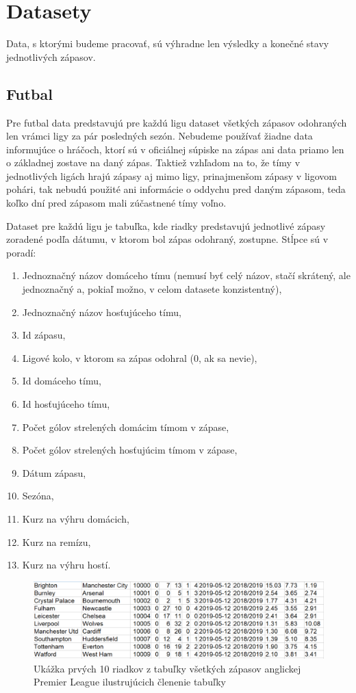 \chapter{Datasety}

Data, s ktorými budeme pracovať, sú výhradne len výsledky a konečné stavy jednotlivých zápasov. 

\section{Futbal} \label{foot}
Pre futbal data predstavujú pre každú ligu dataset všetkých zápasov odohraných len vrámci ligy za pár posledných sezón. 
Nebudeme používať žiadne data informujúce o hráčoch, ktorí sú v oficiálnej súpiske na zápas ani data priamo len o základnej zostave na daný zápas. 
Taktiež vzhľadom na to, že tímy v jednotlivých ligách hrajú zápasy aj mimo ligy, prinajmenšom zápasy v ligovom pohári, tak nebudú použité ani informácie o oddychu pred daným zápasom, teda koľko dní pred zápasom mali zúčastnené tímy voľno.

Dataset pre každú ligu je tabuľka, kde riadky predstavujú jednotlivé zápasy zoradené podľa dátumu, v ktorom bol zápas odohraný, zostupne.
Stĺpce sú v poradí:
\begin{enumerate}
  \item Jednoznačný názov domáceho tímu (nemusí byť celý názov, stačí skrátený, ale jednoznačný a, pokiaľ možno, v celom datasete konzistentný),
  \item Jednoznačný názov hosťujúceho tímu,
  \item Id zápasu,
  \item Ligové kolo, v ktorom sa zápas odohral (0, ak sa nevie),
  \item Id domáceho tímu,
  \item Id hosťujúceho tímu,
  \item Počet gólov strelených domácim tímom v zápase,
  \item Počet gólov strelených hosťujúcim tímom v zápase,
  \item Dátum zápasu,
  \item Sezóna,
  \item Kurz na výhru domácich,
  \item Kurz na remízu,
  \item Kurz na výhru hostí.
\end{enumerate}

\noindent
\begin{figure}
\includegraphics[width=\textwidth]{../img/eng.png}
\caption{Ukážka prvých 10 riadkov z tabuľky všetkých zápasov anglickej Premier League ilustrujúcich členenie tabuľky}
\end{figure}

